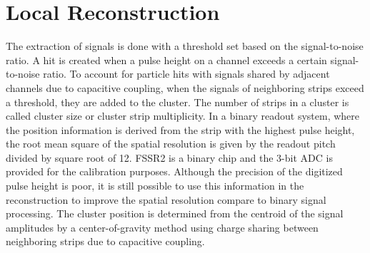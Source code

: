 \section{Local Reconstruction}

The extraction of signals is done with a threshold set based on the signal-to-noise ratio. A hit is created when a pulse height on a channel exceeds a certain signal-to-noise ratio. To account for particle hits with signals shared by adjacent channels due to capacitive coupling, when the signals of neighboring strips exceed a threshold, they are added to the cluster. The number of strips in a cluster is called cluster size or cluster strip multiplicity. In a binary readout system, where the position information is derived from the strip with the highest pulse height, the root mean square of the spatial resolution is given by the readout pitch divided by square root of 12. FSSR2 is a binary chip and the 3-bit ADC is provided for the calibration purposes. Although the precision of the digitized pulse height is poor, it is still possible to use this information in the reconstruction to improve the spatial resolution compare to binary signal processing. The cluster position is determined from the centroid of the signal amplitudes by a center-of-gravity method using charge sharing between neighboring strips due to capacitive coupling. 
